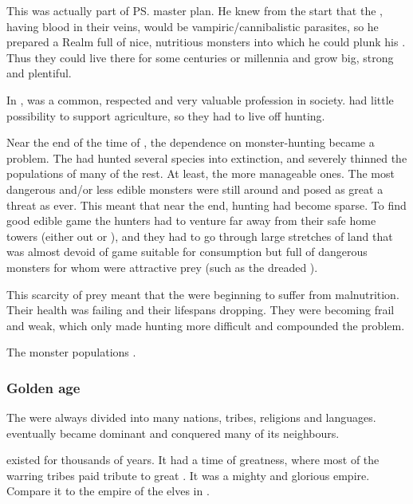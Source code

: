 This was actually part of \ps{\Daggerrain} master plan. 
He knew from the start that the \resphain, having \bane{} blood in their veins, would be vampiric/cannibalistic parasites, so he prepared a Realm full of nice, nutritious monsters into which he could plunk his \resphain. 
Thus they could live there for some centuries or millennia and grow big, strong and plentiful. 

In \Merkyrah,  was a common, respected and very valuable profession in society. 
\Nyx{} had little possibility to support agriculture, so they had to live off hunting. 

Near the end of the time of \Merkyrah, the dependence on monster-hunting became a problem.
The \resphain{} had hunted several species into extinction, and severely thinned the populations of many of the rest.
At least, the more manageable ones. 
The most dangerous and/or less edible monsters were still around and posed as great a threat as ever. 
This meant that near the end, hunting had become sparse. 
To find good edible game the \resphan{} hunters had to venture far away from their safe home towers (either out or \emph{}), and they had to go through large stretches of land that was almost devoid of game suitable for \resphan{} consumption but full of dangerous monsters for whom \emph{\resphain{}} were attractive prey (such as the dreaded ). 

This scarcity of prey meant that the \resphain{} were beginning to suffer from malnutrition. 
Their health was failing and their lifespans dropping. 
They were becoming frail and weak, which only made hunting more difficult and compounded the problem. 

The monster populations . 





\subsubsection{Golden age}
The \resphain were always divided into many nations, tribes, religions and languages. 
\Merkyrah eventually became dominant and conquered many of its neighbours. 

\Merkyrah existed for thousands of years. 
It had a time of greatness, where most of the warring tribes paid tribute to great \Merkyrah. 
It was a mighty and glorious empire.
Compare it to the empire of the elves in \cite{RPG:Warhammer}. 





